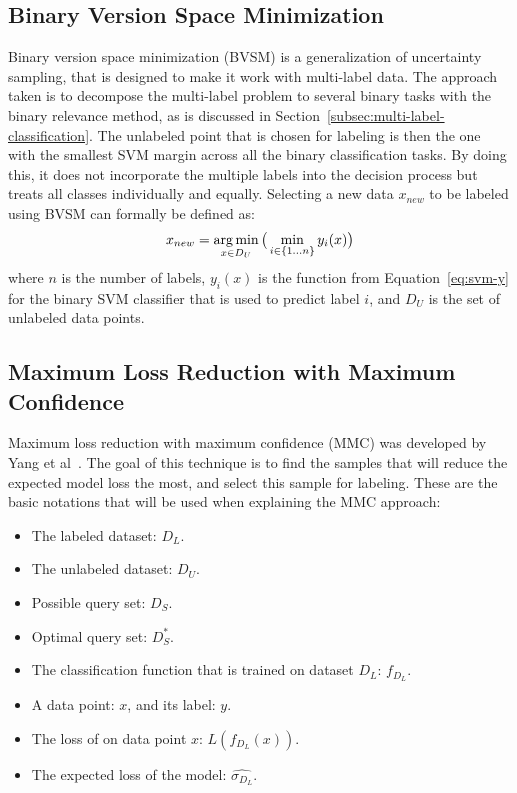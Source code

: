 \subsection{Binary Version Space Minimization}\label{subsec:binmin}

Binary version space minimization (BVSM) is a generalization of uncertainty sampling, that is designed to make it work with multi-label data.
The approach taken is to decompose the multi-label problem to several binary tasks with the binary relevance method, as is discussed in Section~\ref{subsec:multi-label-classification}.
The unlabeled point that is chosen for labeling is then the one with the smallest SVM margin across all the binary classification tasks.
By doing this, it does not incorporate the multiple labels into the decision process but treats all classes individually and equally. 
Selecting a new data $x_{new}$ to be labeled using BVSM can formally be defined as:
\begin{equation}
    x_{new} = \operatorname*{arg\,min}_{x \in D_U} \big( \min_{i \in \{1 \dots n\}} y_i(x) \big)
\end{equation}
where $n$ is the number of labels, $y_i(x)$ is the function from Equation~\ref{eq:svm-y} for the binary SVM classifier that is used to predict label $i$, and $D_U$ is the set of unlabeled data points.

\subsection{Maximum Loss Reduction with Maximum Confidence}\label{subsec:mmc}

Maximum loss reduction with maximum confidence (MMC) was developed by Yang et al~\cite{yang2009effective}.
The goal of this technique is to find the samples that will reduce the expected model loss the most, and select this sample for labeling.
These are the basic notations that will be used when explaining the MMC approach:
\begin{itemize}
    \item The labeled dataset: $D_L$.
    \item The unlabeled dataset: $D_U$.
    \item Possible query set: $D_S$.
    \item Optimal query set: $D^*_S$.
    \item The classification function that is trained on dataset $D_L$: $f_{D_L}$.
    \item A data point: $x$, and its label: $y$.
    \item The loss of on data point $x$: $L(f_{D_L}(x))$.
    \item The expected loss of the model: $\widehat{\sigma_{D_L}}$.
\end{itemize}

